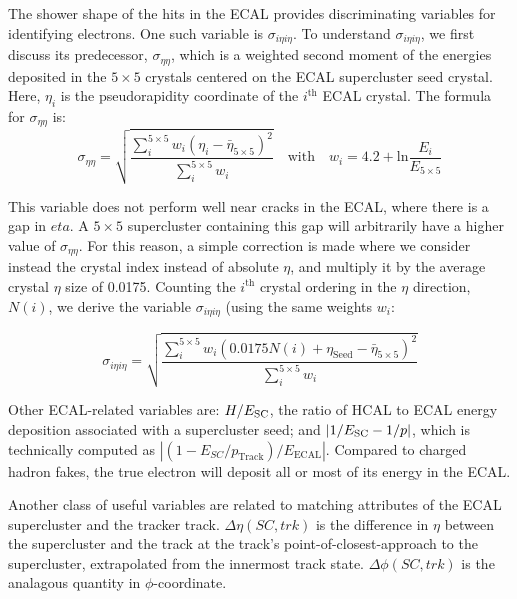 The shower shape of the hits in the ECAL provides discriminating variables for identifying electrons.
One such variable is $\sigma_{i\eta i\eta}$.
To understand $\sigma_{i\eta i\eta}$, we first discuss its predecessor, $\sigma_{\eta\eta}$,
which is a weighted second moment of the energies deposited in the $5\times5$ crystals
centered on the ECAL supercluster seed crystal. Here, $\eta_i$ is the pseudorapidity
coordinate of the $i^{\mathrm{th}}$ ECAL crystal. The formula for $\sigma_{\eta\eta}$ is:
\begin{equation}
  \sigma_{\eta\eta} = \sqrt{\frac{\sum_{i}^{\mathrm{5\times5}}w_{i}(\eta_{i}-\bar{\eta}_{\mathrm{5\times5}})^{2}}{\sum_{i}^{\mathrm{5\times5}}w_{i}}}
  \quad\mathrm{with}\quad w_{i} = 4.2 + \mathrm{ln} \frac{E_i}{E_{\mathrm{5\times5}}}
\end{equation}

This variable does not perform well near cracks in the ECAL, where there is a gap in $eta$.
A $\mathrm{5\times5}$ supercluster containing this gap will arbitrarily have a higher value of $\sigma_{\eta\eta}$.
For this reason, a simple correction is made where we consider instead the crystal index instead of absolute $\eta$, and multiply it by the average crystal $\eta$ size of 0.0175.
Counting the $i^{\mathrm{th}}$ crystal ordering in the $\eta$ direction, $N(i)$, we derive the variable $\sigma_{i\eta i\eta}$ (using the same weights $w_{i}$:

\begin{equation}
  \sigma_{i\eta i\eta} = \sqrt{\frac{\sum_{i}^{\mathrm{5\times5}}w_{i}(0.0175 N(i) + \eta_{\mathrm{Seed}} - \bar{\eta}_{\mathrm{5\times5}})^{2}}{\sum_{i}^{\mathrm{5\times5}}w_{i}}}
\end{equation}

Other ECAL-related variables are:
$H/E_{\rm SC}$, the ratio of HCAL to ECAL energy deposition associated
with a supercluster seed; and $|1/E_{\rm SC} - 1/p|$,
which is technically computed as $|(1 - E_{SC}/p_{\mathrm{Track}})/E_{\mathrm{ECAL}}|$.
Compared to charged hadron fakes, the true electron will deposit all or most of its energy in the ECAL.

Another class of useful variables are related to matching attributes of the ECAL supercluster
and the tracker track. $\Delta\eta(SC,trk)$ is the difference in $\eta$ between the 
supercluster and the track at the track's point-of-closest-approach to the supercluster, 
extrapolated from the innermost track state. $\Delta\phi(SC,trk)$ is the analagous quantity
in $\phi$-coordinate.

